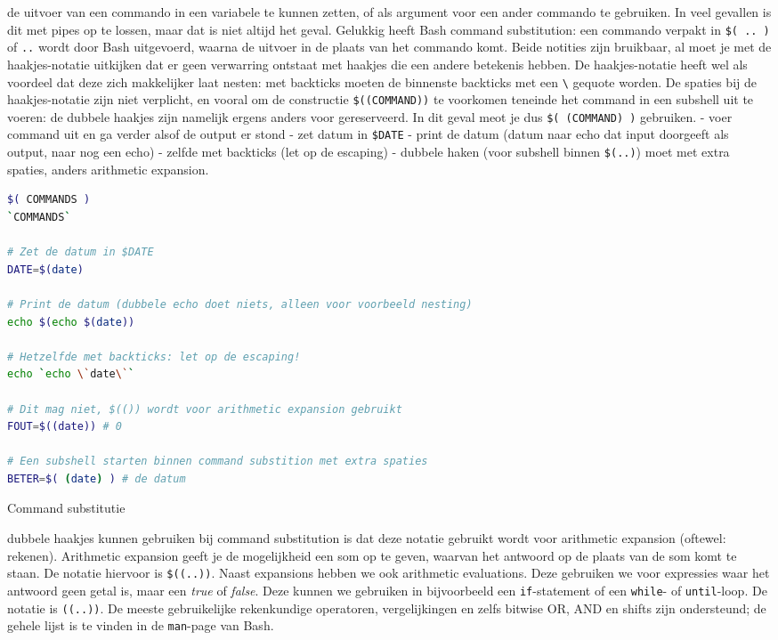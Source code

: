  de uitvoer van een commando in een variabele te kunnen zetten, of als argument voor een ander commando te gebruiken. In veel gevallen is dit met pipes op te lossen, maar dat is niet altijd het geval. Gelukkig heeft Bash command substitution: een commando verpakt in \texttt{\$(\ ..\ )} of \texttt{\textasciigrave{}..\textasciigrave{}} wordt door Bash uitgevoerd, waarna de uitvoer in de plaats van het commando komt. Beide notities zijn bruikbaar, al moet je met de haakjes-notatie uitkijken dat er geen verwarring ontstaat met haakjes die een andere betekenis hebben. De haakjes-notatie heeft wel als voordeel dat deze zich makkelijker laat nesten: met backticks moeten de binnenste backticks met een \texttt{\textbackslash{}} gequote worden. De spaties bij de haakjes-notatie zijn niet verplicht, en vooral om de constructie \texttt{\$((COMMAND))} te voorkomen teneinde het command in een subshell uit te voeren: de dubbele haakjes zijn namelijk ergens anders voor gereserveerd. In dit geval meot je dus \texttt{\$(\ (COMMAND)\ )} gebruiken. - voer command uit en ga verder alsof de output er stond - zet datum in \texttt{\$DATE} - print de datum (datum naar echo dat input doorgeeft als output, naar nog een echo) - zelfde met backticks (let op de escaping) - dubbele haken (voor subshell binnen \texttt{\$(..)}) moet met extra spaties, anders arithmetic expansion.

\begin{listing}
\begin{lstlisting}[language=Bash]
$( COMMANDS )
`COMMANDS`

# Zet de datum in $DATE
DATE=$(date)

# Print de datum (dubbele echo doet niets, alleen voor voorbeeld nesting)
echo $(echo $(date))

# Hetzelfde met backticks: let op de escaping!
echo `echo \`date\``

# Dit mag niet, $(()) wordt voor arithmetic expansion gebruikt
FOUT=$((date)) # 0

# Een subshell starten binnen command substition met extra spaties
BETER=$( (date) ) # de datum  
\end{lstlisting}
\caption{Command substitutie}
\end{listing}

 dubbele haakjes kunnen gebruiken bij command substitution is dat deze notatie gebruikt wordt voor arithmetic expansion (oftewel: rekenen). Arithmetic expansion geeft je de mogelijkheid een som op te geven, waarvan het antwoord op de plaats van de som komt te staan. De notatie hiervoor is \texttt{\$((..))}. Naast expansions hebben we ook arithmetic evaluations. Deze gebruiken we voor expressies waar het antwoord geen getal is, maar een \emph{true} of \emph{false}. Deze kunnen we gebruiken in bijvoorbeeld een \texttt{if}-statement of een \texttt{while}- of \texttt{until}-loop. De notatie is \texttt{((..))}. De meeste gebruikelijke rekenkundige operatoren, vergelijkingen en zelfs bitwise OR, AND en shifts zijn ondersteund; de gehele lijst is te vinden in de \texttt{man}-page van Bash.

